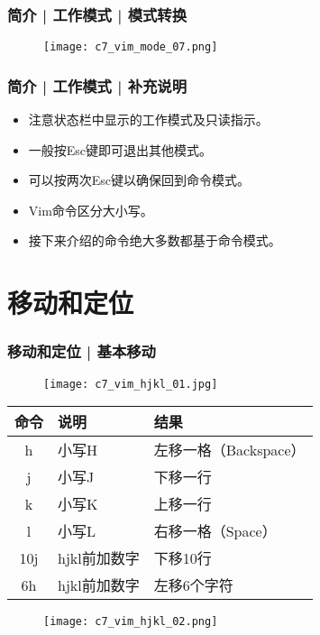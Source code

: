 \begin{frame}
  \frametitle{简介 | 工作模式 | 模式转换}
  \begin{figure}
    \centering
    \texttt{[image: c7\_vim\_mode\_07.png]}
  \end{figure}
\end{frame}

\begin{frame}
  \frametitle{简介 | 工作模式 | 补充说明}
  \begin{itemize}[<+->]
    \item 注意状态栏中显示的工作模式及只读指示。
    \item 一般按Esc键即可退出其他模式。
    \item 可以按两次Esc键以确保回到命令模式。
    \item Vim命令区分大小写。
    \item 接下来介绍的命令绝大多数都基于命令模式。
  \end{itemize}
\end{frame}

\section{移动和定位}
\begin{frame}
  \frametitle{移动和定位 | \alert{基本移动}}
  \begin{figure}
    \centering
    \texttt{[image: c7\_vim\_hjkl\_01.jpg]}
  \end{figure}
  \begin{table}
    \centering
    \begin{tabularx}{0.8\textwidth}{cXX}
      \hline
      \rowcolor{blue!50}命令 & 说明 & 结果\\
      \hline
      h & 小写H & 左移一格（Backspace）\\
      j & 小写J & 下移一行\\
      k & 小写K & 上移一行\\
      l & 小写L & 右移一格（Space）\\
      10j & hjkl前加数字 & 下移10行\\
      6h & hjkl前加数字 & 左移6个字符\\
      \hline
    \end{tabularx}
  \end{table}
  \begin{figure}
    \centering
    \texttt{[image: c7\_vim\_hjkl\_02.png]}
  \end{figure}
\end{frame}


